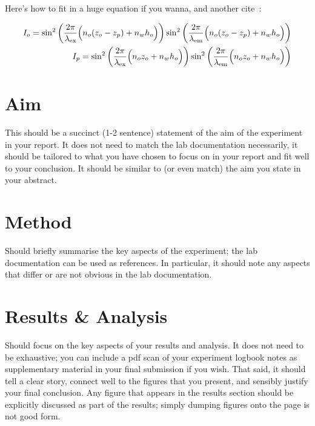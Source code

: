 \documentclass[aps,prl,reprint,10pt,amsmath,amssymb,superscriptaddress,a4paper]{revtex4-2}
\begin{document}
\lipsum[2] %

Here's how to fit in a huge equation if you wanna, and another cite~\citep{Smith:2012qr}:

\begin{widetext}
\begin{eqnarray}
\label{eqn2} I_{o} = \sin^{2}\left(\frac{2\pi}{\lambda_{\text{ex}}}\Bigl(n_{o}(z_{o}-z_{p})+n_{w}h_{o}\Bigr)\right)\sin^{2}\left(\frac{2\pi}{\lambda_{\text{em}}}\Bigl(n_{o}(z_{o}-z_{p})+n_{w}h_{o}\Bigr)\right) \\
\label{eqn3} I_{p} = \sin^{2}\left(\frac{2\pi}{\lambda_{\text{ex}}}\Bigl(n_{o}z_{o}+n_{w}h_{o}\Bigr)\right)\sin^{2}\left(\frac{2\pi}{\lambda_{\text{em}}}\Bigl(n_{o}z_{o}+n_{w}h_{o}\Bigr)\right)
\end{eqnarray}
\end{widetext}

\lipsum[3] %

\section{Aim}

This should be a succinct (1-2 sentence) statement of the aim of the experiment in your report. It does not need to match the lab documentation necessarily, it should be tailored to what you have chosen to focus on in your report and fit well to your conclusion. It should be similar to (or even match) the aim you state in your abstract.

\section{Method}

Should briefly summarise the key aspects of the experiment; the lab documentation can be used as references. In particular, it should note any aspects that differ or are not obvious in the lab documentation.

\lipsum[4] %

\section{Results \& Analysis}

Should focus on the key aspects of your results and analysis. It does not need to be exhaustive; you can include a pdf scan of your experiment logbook notes as supplementary material in your final submission if you wish. That said, it should tell a clear story, connect well to the figures that you present, and sensibly justify your final conclusion. Any figure that appears in the results section should be explicitly discussed as part of the results; simply dumping figures onto the page is not good form.
\end{document}
